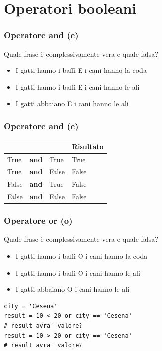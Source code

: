 \documentclass{beamer}
\begin{document}
\section{Operatori booleani}

\begin{frame}[fragile]
\frametitle{Operatore and (e)}
\begin{block}{Quale frase è complessivamente vera e quale falsa?}
    \begin{itemize}
        \item I gatti hanno i baffi E i cani hanno la coda
        \item I gatti hanno i baffi E i cani hanno le ali
        \item I gatti abbaiano E i cani hanno le ali
    \end{itemize}
\end{block}

\end{frame}

\begin{frame}[fragile]
\frametitle{Operatore and (e)}

\begin{tabu} to 0.8\textwidth { | X[l] | X[c] | X[c] |  X[r] |}
 \hline
  & & & Risultato\\
 \hline
 True & \textbf{and} & True & True\\
 \hline
 True & \textbf{and} & False & False\\
 \hline
 False & \textbf{and} & True & False\\
\hline
 False & \textbf{and} & False& False\\
\hline
\end{tabu}

\end{frame}

\begin{frame}[fragile]
\frametitle{Operatore or (o)}
\begin{block}{Quale frase è complessivamente vera e quale falsa?}
    \begin{itemize}
        \item I gatti hanno i baffi O i cani hanno la coda
        \item I gatti hanno i baffi O i cani hanno le ali
        \item I gatti abbaiano O i cani hanno le ali
    \end{itemize}
\end{block}

    \begin{lstlisting}
city = 'Cesena'
result = 10 < 20 or city == 'Cesena'
# result avra' valore?
result = 10 > 20 or city == 'Cesena'
# result avra' valore?
    \end{lstlisting}

\end{frame}
\end{document}
